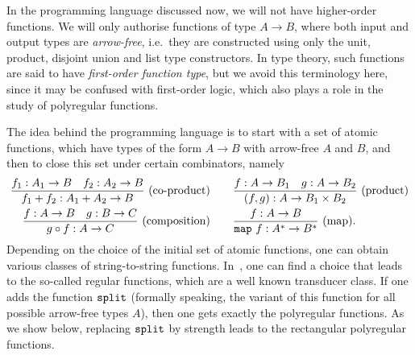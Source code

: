 \documentclass[a4paper,UKenglish,cleveref, autoref, thm-restate]{lipics-v2021}
\begin{document}
In the programming language discussed now, we will not have higher-order functions. We will only authorise functions of type $A \to B$, where both input and output types are \emph{arrow-free}, i.e.~they are constructed using only the unit, product, disjoint union and list type constructors. In type theory, such functions are said to have \emph{first-order function type}, but we avoid this terminology here, since it may be confused with first-order logic, which also plays a role in the study of polyregular functions. 

The idea behind the programming language  is to start with a set of atomic functions, which have types of the form $A \to B$ with arrow-free $A$ and $B$, and then to close this set under certain combinators, namely 
\begin{align*}
\frac{f_1 : A_1 \to B \quad f_2 : A_2 \to B}{f_1 + f_2 : A_1 + A_2 \to B}\text{\ (co-product)} \qquad & 
\frac{f : A \to B_1 \quad g : A \to B_2}{(f,g) : A \to B_1 \times B_2}\text{\ (product)} \\
\frac{f : A \to B \quad g : B \to C}{g \circ f : A \to C}\text{\ (composition)} \qquad  & 
\frac{f : A \to B}{\mathtt{map}\ f : A^* \to B^*}\text{\ (map)}.
\end{align*}
Depending on the choice of the initial set of atomic functions, one can obtain various classes of string-to-string functions. In~\cite[Section 6]{bojanczykRegularFirstOrderList2018}, one can find a choice that leads to the so-called regular functions, which are a well known transducer class. If one adds the function $\mathtt{split}$ (formally speaking, the variant of this  function for all possible arrow-free types $A$), then one  gets exactly the polyregular functions. As we show below, replacing $\mathtt{split}$ by strength leads to the rectangular polyregular functions.
\end{document}
